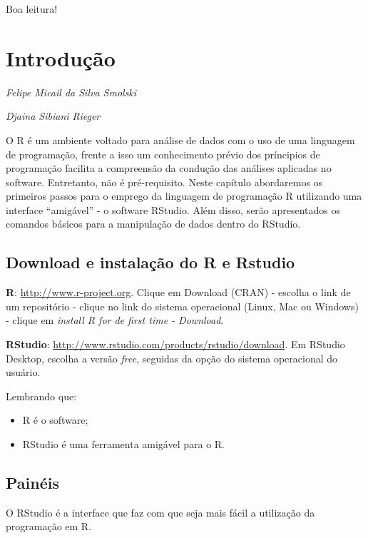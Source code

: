 \documentclass[12pt,brazil,oneside]{book}
\providecommand{\tightlist}{%
  \setlength{\itemsep}{0pt}\setlength{\parskip}{0pt}}
\begin{document}
Boa leitura!

\hypertarget{intro}{%
\chapter{Introdução}\label{intro}}

\begin{flushright}
\emph{Felipe Micail da Silva Smolski}

\emph{Djaina Sibiani Rieger}
\end{flushright}

O R é um ambiente voltado para análise de dados com o uso de uma
linguagem de programação, frente a isso um conhecimento prévio dos
príncipios de programação facilita a compreensão da condução das
análises aplicadas no software. Entretanto, não é pré-requisito. Neste
capítulo abordaremos os primeiros passos para o emprego da linguagem de
programação R utilizando uma interface ``amigável'' - o software
RStudio. Além disso, serão apresentados os comandos básicos para a
manipulação de dados dentro do RStudio.

\hypertarget{download-e-instalacao-do-r-e-rstudio}{%
\section{Download e instalação do R e
Rstudio}\label{download-e-instalacao-do-r-e-rstudio}}

\textbf{R}: \url{http://www.r-project.org}. Clique em Download (CRAN) -
escolha o link de um repositório - clique no link do sistema operacional
(Linux, Mac ou Windows) - clique em \emph{install R for de first time -
Download}.

\textbf{RStudio}:
\url{http://www.rstudio.com/products/rstudio/download}. Em RStudio
Desktop, escolha a versão \emph{free}, seguidas da opção do sistema
operacional do usuário.

Lembrando que:

\begin{itemize}
\tightlist
\item
  R é o software;
\item
  RStudio é uma ferramenta amigável para o R.
\end{itemize}

\hypertarget{paineis}{%
\section{Painéis}\label{paineis}}

O RStudio é a interface que faz com que seja mais fácil a utilização da
programação em R.
\end{document}

